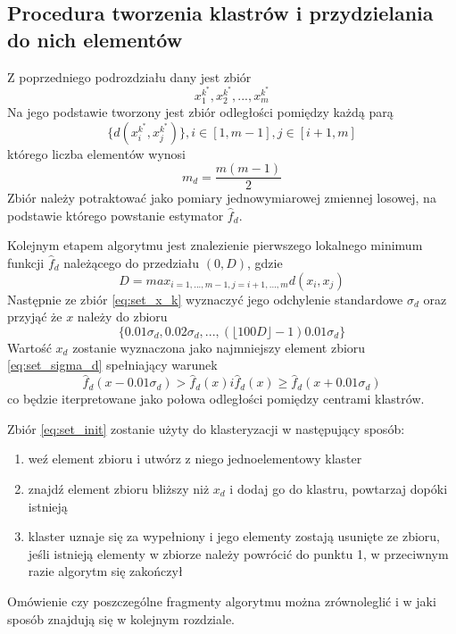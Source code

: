 \subsection{Procedura tworzenia klastrów i przydzielania do nich elementów}
\label{subsec:tworzenie_klastrow}
Z poprzedniego podrozdziału dany jest zbiór
\begin{equation} \label{eq:set_init}
x^{k^*}_1, x^{k^*}_2, ..., x^{k^*}_m 
\end{equation}
Na jego podstawie tworzony jest zbiór odległości pomiędzy każdą parą
\begin{equation} \label{eq:set_x_k}
\{ d(x^{k^*}_i, x^{k^*}_j) \}, i \in [1, m-1], j \in [i+1,m]
\end{equation}
którego liczba elementów wynosi
\begin{equation}
m_d=\frac{m(m-1)}{2}
\end{equation}
Zbiór należy potraktować jako pomiary jednowymiarowej zmiennej losowej, na podstawie którego powstanie estymator $\hat{f}_d$.

Kolejnym etapem algorytmu jest znalezienie pierwszego lokalnego minimum funkcji $\hat{f}_d$ należącego do przedziału $(0, D)$, gdzie
\begin{equation}
D = max_{i=1, ..., m-1, j=i+1, ..., m } d(x_i,x_j)
\end{equation}
Następnie ze zbiór \ref{eq:set_x_k} wyznaczyć jego odchylenie standardowe $\sigma_d$ oraz przyjąć że $x$ należy do zbioru
\begin{equation} \label{eq:set_sigma_d}
\{0.01 \sigma_d , 0.02 \sigma_d , ..., ( \lfloor 100D \rfloor -1) 0.01 \sigma_d \}
\end{equation}
Wartość $x_d$ zostanie wyznaczona jako najmniejszy element zbioru \ref{eq:set_sigma_d} spełniający warunek
\begin{equation}
\hat{f}_d(x-0.01\sigma_d) > \hat{f}_d(x) i \hat{f}_d(x) \geq \hat{f}_d(x+0.01\sigma_d) 
\end{equation}
co będzie iterpretowane jako połowa odległości pomiędzy centrami klastrów.


Zbiór \ref{eq:set_init} zostanie użyty do klasteryzacji w następujący sposób:
\begin{enumerate}
\item weź element zbioru i utwórz z niego jednoelementowy klaster
\item znajdź element zbioru bliższy niż $x_d$ i dodaj go do klastru, powtarzaj dopóki istnieją
\item klaster uznaje się za wypełniony i jego elementy zostają usunięte ze zbioru, jeśli istnieją elementy w zbiorze należy powrócić do punktu 1, w przeciwnym razie algorytm się zakończył
\end{enumerate}

Omówienie czy poszczególne fragmenty algorytmu można zrównoleglić i w jaki sposób znajdują się w kolejnym rozdziale.